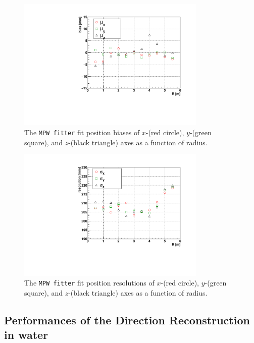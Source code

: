 \begin{figure}[htbp]
	\centering	
	\includegraphics[width=9cm]{shellTest_RvsBias.pdf}
	\caption[The \texttt{MPW fitter} fit position biases ($\mu_{x,y,z}$) as a function of radius.]{The \texttt{MPW fitter} fit position biases of $x$-(red circle), $y$-(green square), and $z$-(black triangle) axes as a function of radius.}
	\label{fig:FitBiasVsShell}
\end{figure}

\begin{figure}[htbp]
	\centering	
	\includegraphics[width=9cm]{shellTest_RvsResol.pdf}
	\caption[The \texttt{MPW fitter} fit position resolutions ($\sigma_{x,y,z}$) as a function of radius.]{The \texttt{MPW fitter} fit position resolutions of $x$-(red circle), $y$-(green square), and $z$-(black triangle) axes as a function of radius.}
	\label{fig:FitResolVsShell}
\end{figure}
 
\subsection{Performances of the Direction Reconstruction in water}\label{sect:directResol}

